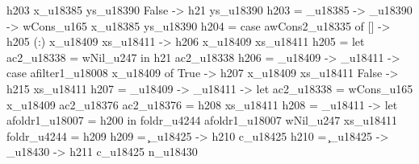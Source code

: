                                                                                               h203 x_u18385 ys_u18390
                                                                                            False ->
                                                                                              h21 ys_u18390
                                                        h203 = \x_u18385 -> \ys_u18390 -> wCons_u165 x_u18385 ys_u18390
                                                        h204 = case awCons2_u18335 of
                                                                 [] -> h205
                                                                 (:) x_u18409 xs_u18411 ->
                                                                   h206 x_u18409 xs_u18411
                                                        h205 = let ac2_u18338 = wNil_u247
                                                               in h21 ac2_u18338
                                                        h206 = \x_u18409 -> \xs_u18411 -> case afilter1_u18008 x_u18409 of
                                                                                            True ->
                                                                                              h207 x_u18409 xs_u18411
                                                                                            False ->
                                                                                              h215 xs_u18411
                                                        h207 = \x_u18409 -> \xs_u18411 -> let
                                                                                            ac2_u18338 = wCons_u165 x_u18409 ac2_u18376
                                                                                            ac2_u18376 = h208 xs_u18411
                                                                                            h208 = \xs_u18411 -> let
                                                                                                                   afoldr1_u18007 = h200
                                                                                                                 in foldr_u4244 afoldr1_u18007 wNil_u247 xs_u18411
                                                                                            foldr_u4244 = h209
                                                                                            h209 = \c_u18425 -> h210 c_u18425
                                                                                            h210 = \c_u18425 -> \n_u18430 -> h211 c_u18425 n_u18430
